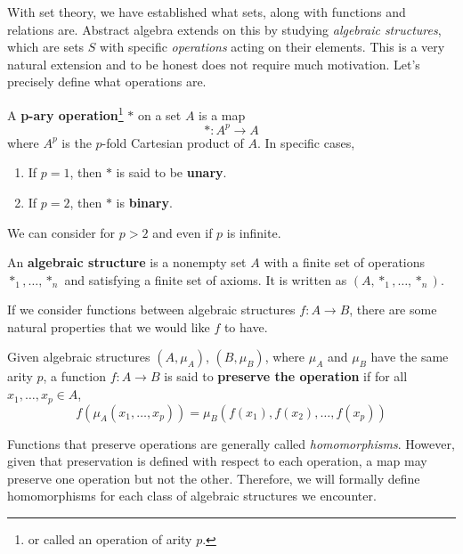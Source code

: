 With set theory, we have established what sets, along with functions and relations are. Abstract algebra extends on this by studying \textit{algebraic structures}, which are sets $S$ with specific \textit{operations} acting on their elements. This is a very natural extension and to be honest does not require much motivation. Let's precisely define what operations are. 

\begin{definition}[Operation]
  A \textbf{p-ary operation}\footnote{or called an operation of arity $p$.} $\ast$ on a set $A$ is a map 
  \begin{equation}
    \ast : A^p \longrightarrow A
  \end{equation} 
  where $A^p$ is the $p$-fold Cartesian product of $A$. In specific cases, 
  \begin{enumerate}
    \item If $p = 1$, then $\ast$ is said to be \textbf{unary}. 
    \item If $p = 2$, then $\ast$ is \textbf{binary}. 
  \end{enumerate}
  We can consider for $p > 2$ and even if $p$ is infinite.  
\end{definition}

\begin{definition}
  An \textbf{algebraic structure} is a nonempty set $A$ with a finite set of operations $\ast_1, \ldots, \ast_n$ and satisfying a finite set of axioms. It is written as $(A, \ast_1, \ldots, \ast_n)$. 
\end{definition} 

If we consider functions between algebraic structures $f: A \rightarrow B$, there are some natural properties that we would like $f$ to have. 

\begin{definition}
  Given algebraic structures $(A, \mu_A)$, $(B, \mu_B)$, where $\mu_A$ and $\mu_B$ have the same arity $p$, a function $f: A \rightarrow B$ is said to \textbf{preserve the operation} if for all $x_1, \ldots, x_p \in A$, 
  \begin{equation}
    f(\mu_A(x_1, \ldots, x_p)) = \mu_B (f(x_1), f(x_2), \ldots, f(x_p))
  \end{equation}
\end{definition} 

Functions that preserve operations are generally called \textit{homomorphisms}. However, given that preservation is defined with respect to each operation, a map may preserve one operation but not the other. Therefore, we will formally define homomorphisms for each class of algebraic structures we encounter. 

